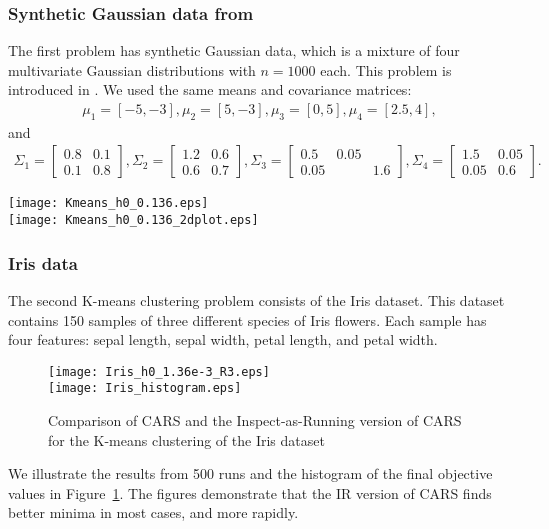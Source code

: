 \subsubsection*{Synthetic Gaussian data from \cite{yin2018stochastic}}
The first problem has synthetic Gaussian data, which is a mixture of four multivariate Gaussian distributions with $n = 1000$ each. This problem is introduced in \cite{yin2018stochastic}. We used the same means and covariance matrices:
\begin{align*}
    \mu_1 = [-5, -3], \mu_2 = [5, -3], \mu_3 = [0, 5], \mu_4 = [2.5, 4],
\end{align*}
    and 
\begin{align*}
    \Sigma_1 = \begin{bmatrix}
        0.8 & 0.1 \\ 0.1 & 0.8
    \end{bmatrix}, 
    \Sigma_2 = \begin{bmatrix}
        1.2 & 0.6 \\ 0.6 & 0.7
    \end{bmatrix}, 
    \Sigma_3 = \begin{bmatrix}
        0.5 & 0.05 \\ 0.05 && 1.6
    \end{bmatrix},
    \Sigma_4 = \begin{bmatrix}
        1.5 & 0.05 \\ 0.05 & 0.6
    \end{bmatrix}.
\end{align*}
\begin{figure*}
    \centering
    {\texttt{[image: Kmeans\_h0\_0.136.eps]}}\\
    \vspace{3mm}
    {\texttt{[image: Kmeans\_h0\_0.136\_2dplot.eps]}}
    \caption{Comparison of CARS and the Inspect-as-Running version of CARS for the K-means clustering problem of synthetic Gaussian data}
    \label{fig: K-means synthetic}
\end{figure*}

\subsubsection*{Iris data}
The second K-means clustering problem consists of the Iris dataset. This dataset contains 150 samples of three different species of Iris flowers. Each sample has four features: sepal length, sepal width, petal length, and petal width.
\begin{figure}
    \centering
    {\texttt{[image: Iris\_h0\_1.36e-3\_R3.eps]}}\\
    \vspace{3mm}
    {\texttt{[image: Iris\_histogram.eps]}}
    \caption{Comparison of CARS and the Inspect-as-Running version of CARS for the K-means clustering of the Iris dataset}
    \label{fig: K-means Iris}
\end{figure}
We illustrate the results from 500 runs and the histogram of the final objective values in Figure~\ref{fig: K-means Iris}.
The figures demonstrate that the IR version of CARS finds better minima in most cases, and more rapidly.

